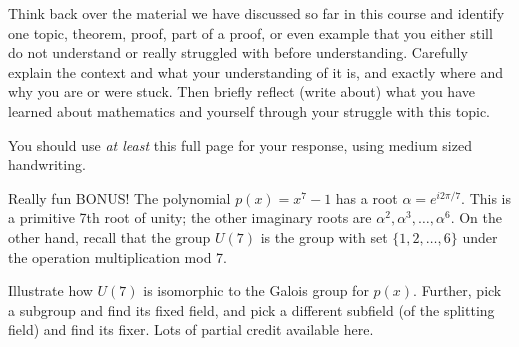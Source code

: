 \documentclass[10pt]{exam}
\def\Q{\mathbb Q}
\begin{document}
\begin{questions}




\clearpage


\question[15] Think back over the material we have discussed so far in this course and identify one topic, theorem, proof, part of a proof, or even example that you either still do not understand or really struggled with before understanding.  Carefully explain the context and what your understanding of it is, and exactly where and why you are or were stuck.  Then briefly reflect (write about) what you have learned about mathematics and yourself through your struggle with this topic.

You should use \emph{at least} this full page for your response, using medium sized handwriting. 

\clearpage

\bonusquestion[15] Really fun BONUS! The polynomial $p(x) = x^7-1$ has a root $\alpha = e^{i2\pi/7}$.  This is a primitive 7th root of unity; the other imaginary roots are $\alpha^2, \alpha^3, \ldots, \alpha^6$.  On the other hand, recall that the group $U(7)$ is the group with set $\{1, 2,\ldots, 6\}$ under the operation multiplication mod 7.

Illustrate how $U(7)$ is isomorphic to the Galois group for $p(x)$.  Further, pick a subgroup and find its fixed field, and pick a different subfield (of the splitting field) and find its fixer.  Lots of partial credit available here.


\end{questions}
\end{document}
